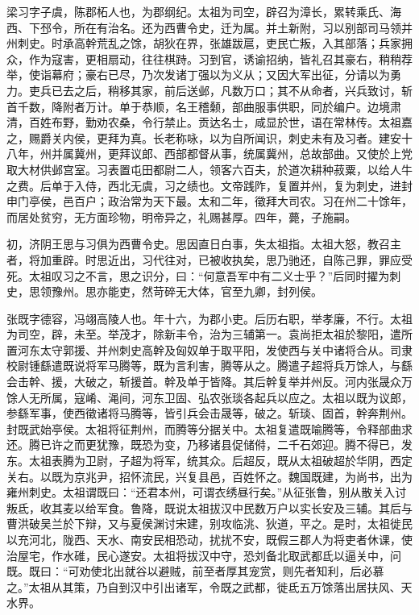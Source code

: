 \documentclass[12pt,UTF8]{ctexbook}
\begin{document}
梁习字子虞，陈郡柘人也，为郡纲纪。太祖为司空，辟召为漳长，累转乘氏、海西、下邳令，所在有治名。还为西曹令史，迁为属。并土新附，习以别部司马领并州刺史。时承高幹荒乱之馀，胡狄在界，张雄跋扈，吏民亡叛，入其部落；兵家拥众，作为寇害，更相扇动，往往棋跱。习到官，诱谕招纳，皆礼召其豪右，稍稍荐举，使诣幕府；豪右已尽，乃次发诸丁强以为义从；又因大军出征，分请以为勇力。吏兵已去之后，稍移其家，前后送邺，凡数万口；其不从命者，兴兵致讨，斩首千数，降附者万计。单于恭顺，名王稽颡，部曲服事供职，同於编户。边境肃清，百姓布野，勤劝农桑，令行禁止。贡达名士，咸显於世，语在常林传。太祖嘉之，赐爵关内侯，更拜为真。长老称咏，以为自所闻识，刺史未有及习者。建安十八年，州并属冀州，更拜议郎、西部都督从事，统属冀州，总故部曲。又使於上党取大材供邺宫室。习表置屯田都尉二人，领客六百夫，於道次耕种菽粟，以给人牛之费。后单于入侍，西北无虞，习之绩也。文帝践阼，复置并州，复为刺史，进封申门亭侯，邑百户；政治常为天下最。太和二年，徵拜大司农。习在州二十馀年，而居处贫穷，无方面珍物，明帝异之，礼赐甚厚。四年，薨，子施嗣。

初，济阴王思与习俱为西曹令史。思因直日白事，失太祖指。太祖大怒，教召主者，将加重辟。时思近出，习代往对，已被收执矣，思乃驰还，自陈己罪，罪应受死。太祖叹习之不言，思之识分，曰：“何意吾军中有二义士乎？”后同时擢为刺史，思领豫州。思亦能吏，然苛碎无大体，官至九卿，封列侯。

张既字德容，冯翊高陵人也。年十六，为郡小吏。后历右职，举孝廉，不行。太祖为司空，辟，未至。举茂才，除新丰令，治为三辅第一。袁尚拒太祖於黎阳，遣所置河东太守郭援、并州刺史高幹及匈奴单于取平阳，发使西与关中诸将合从。司隶校尉锺繇遣既说将军马腾等，既为言利害，腾等从之。腾遣子超将兵万馀人，与繇会击幹、援，大破之，斩援首。幹及单于皆降。其后幹复举并州反。河内张晟众万馀人无所属，寇崤、渑间，河东卫固、弘农张琰各起兵以应之。太祖以既为议郎，参繇军事，使西徵诸将马腾等，皆引兵会击晟等，破之。斩琰、固首，幹奔荆州。封既武始亭侯。太祖将征荆州，而腾等分据关中。太祖复遣既喻腾等，令释部曲求还。腾已许之而更犹豫，既恐为变，乃移诸县促储偫，二千石郊迎。腾不得已，发东。太祖表腾为卫尉，子超为将军，统其众。后超反，既从太祖破超於华阴，西定关右。以既为京兆尹，招怀流民，兴复县邑，百姓怀之。魏国既建，为尚书，出为雍州刺史。太祖谓既曰：“还君本州，可谓衣绣昼行矣。”从征张鲁，别从散关入讨叛氐，收其麦以给军食。鲁降，既说太祖拔汉中民数万户以实长安及三辅。其后与曹洪破吴兰於下辩，又与夏侯渊讨宋建，别攻临洮、狄道，平之。是时，太祖徙民以充河北，陇西、天水、南安民相恐动，扰扰不安，既假三郡人为将吏者休课，使治屋宅，作水碓，民心遂安。太祖将拔汉中守，恐刘备北取武都氐以逼关中，问既。既曰：“可劝使北出就谷以避贼，前至者厚其宠赏，则先者知利，后必慕之。”太祖从其策，乃自到汉中引出诸军，令既之武都，徙氐五万馀落出居扶风、天水界。
\end{document}
